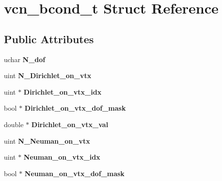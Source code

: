 \hypertarget{structvcn__bcond__t}{\section{vcn\+\_\+bcond\+\_\+t Struct Reference}
\label{structvcn__bcond__t}
}
\subsection*{Public Attributes}
\begin{DoxyCompactItemize}
\item 
\hypertarget{structvcn__bcond__t_a00cc2745d8bd5f9fecf0fb2db5c9c9ce}{uchar {\bfseries N\+\_\+dof}}\label{structvcn__bcond__t_a00cc2745d8bd5f9fecf0fb2db5c9c9ce}

\item 
\hypertarget{structvcn__bcond__t_a74005f18a85e83ae4e325b246467b1d3}{uint {\bfseries N\+\_\+\+Dirichlet\+\_\+on\+\_\+vtx}}\label{structvcn__bcond__t_a74005f18a85e83ae4e325b246467b1d3}

\item 
\hypertarget{structvcn__bcond__t_af7623c672892dc40219d55bb767a8496}{uint $\ast$ {\bfseries Dirichlet\+\_\+on\+\_\+vtx\+\_\+idx}}\label{structvcn__bcond__t_af7623c672892dc40219d55bb767a8496}

\item 
\hypertarget{structvcn__bcond__t_a090bf411e97e07792123754834306704}{bool $\ast$ {\bfseries Dirichlet\+\_\+on\+\_\+vtx\+\_\+dof\+\_\+mask}}\label{structvcn__bcond__t_a090bf411e97e07792123754834306704}

\item 
\hypertarget{structvcn__bcond__t_a7bfeec3c462c749661d8626dd37adb78}{double $\ast$ {\bfseries Dirichlet\+\_\+on\+\_\+vtx\+\_\+val}}\label{structvcn__bcond__t_a7bfeec3c462c749661d8626dd37adb78}

\item 
\hypertarget{structvcn__bcond__t_a33d2598271231518d529558a71d2bb75}{uint {\bfseries N\+\_\+\+Neuman\+\_\+on\+\_\+vtx}}\label{structvcn__bcond__t_a33d2598271231518d529558a71d2bb75}

\item 
\hypertarget{structvcn__bcond__t_aa899223b75dcd82c73218a0de60137f6}{uint $\ast$ {\bfseries Neuman\+\_\+on\+\_\+vtx\+\_\+idx}}\label{structvcn__bcond__t_aa899223b75dcd82c73218a0de60137f6}

\item 
\hypertarget{structvcn__bcond__t_abac092d58dd250b775436c9f2f683ee8}{bool $\ast$ {\bfseries Neuman\+\_\+on\+\_\+vtx\+\_\+dof\+\_\+mask}}\label{structvcn__bcond__t_abac092d58dd250b775436c9f2f683ee8}


\end{DoxyCompactItemize}
